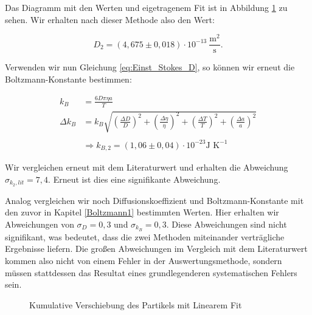 \documentclass{article}
\begin{document}
Das Diagramm mit den Werten und eigetragenem Fit ist in Abbildung \ref{fig:brown3} zu sehen. Wir erhalten nach dieser Methode also den Wert:

\begin{equation}
    D_2 = (4,675 \pm 0,018) \cdot 10^{-13} \ \frac{\text{m}^2}{\text{s}}.
\end{equation}

Verwenden wir nun Gleichung \ref{eq:Einst_Stokes_D}, so können wir erneut die Boltzmann-Konstante bestimmen:

\begin{equation}
    \begin{split}
        k_B &= \frac{6 D \pi \eta a}{T} \\
        \Delta k_B &= k_B \sqrt{\left( \frac{\Delta D}{D} \right)^2 + \left( \frac{\Delta \eta}{\eta} \right)^2 +\left( \frac{\Delta T}{T} \right)^2 +\left( \frac{\Delta a}{a} \right)^2} \\ \\
        &\Rightarrow k_{B,2} = (1,06 \pm 0,04) \cdot 10^{-23} \text{J K}^{-1}
    \end{split}
\end{equation}

Wir vergleichen erneut mit dem Literaturwert und erhalten die Abweichung $\sigma_{k_2,lit} = 7,4$. Erneut ist dies eine signifikante Abweichung. 

Analog vergleichen wir noch Diffusionskoeffizient und Boltzmann-Konstante mit den zuvor in Kapitel \ref{Boltzmann1} bestimmten Werten. Hier erhalten wir Abweichungen von $\sigma_D = 0,3$ und $\sigma_{k_B} = 0,3$. Diese Abweichungen sind nicht signifikant, was bedeutet, dass die zwei Methoden miteinander verträgliche Ergebnisse liefern. Die großen Abweichungen im Vergleich mit dem Literaturwert kommen also nicht von einem Fehler in der Auswertungsmethode, sondern müssen stattdessen das Resultat eines grundlegenderen systematischen Fehlers sein.  

\begin{figure}[!hp]
    \centering
    \caption{Kumulative Verschiebung des Partikels mit Linearem Fit}
    \label{fig:brown3}
\end{figure}
\end{document}
